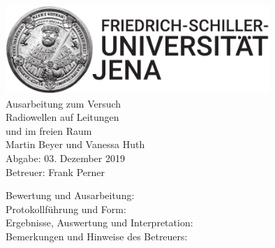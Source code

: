 \documentclass[a4paper,twoside,final]{article}
\begin{document}
\setlength{\marginparsep}{2em}
\renewcommand{\theequation}{\arabic{section}.\arabic{equation}}
\renewcommand{\thefigure}{\arabic{section}.\arabic{figure}}
\renewcommand{\thetable}{\arabic{section}.\arabic{table}}

\begin{center}
\thispagestyle{empty}
  \includegraphics[width=0.75\textwidth]{../UniJena_BildWortMarke_black.pdf}\\[4em]
  \Large
  Ausarbeitung zum Versuch\\[2em]
  \Huge
  Radiowellen auf Leitungen\\
  und im freien Raum\\
  \vspace{2cm}
  \Large
  Martin Beyer und Vanessa Huth\\[2em]
  Abgabe: 03. Dezember 2019\\[2em]
  Betreuer: Frank Perner\\[5em]
  \begin{flushleft}
  	Bewertung und Ausarbeitung:\\[2em]
		Protokollführung und Form:\\[1em]
		Ergebnisse, Auswertung und Interpretation:\\[1em]
		Bemerkungen und Hinweise des Betreuers:
  \end{flushleft}
\end{center}
\clearpage

\pagestyle{fancy}
\renewcommand{\headrulewidth}{0pt}
\renewcommand{\footrulewidth}{0.5pt}
\renewcommand{\sectionmark}[1]{\markright{#1}}
\fancyhead[RE,LO]{\rightmark}
\fancyfoot[LE,RO]{\bfseries\thepage}
\renewcommand{\headrulewidth}{0.5pt}
\renewcommand{\footrulewidth}{0.5pt}

\setcounter{equation}{0}
\setcounter{figure}{0}

\tableofcontents
{}%
\newpage
{}
\end{document}
